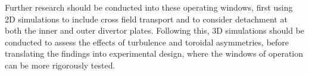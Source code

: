 \documentclass[12pt]{article}  %
\begin{document}
Further research should be conducted into these operating windows, first using 2D simulations to include cross field transport and to consider detachment at both the inner and outer divertor plates. Following this, 3D simulations should be conducted to assess the effects of turbulence and toroidal asymmetries, before translating the findings into experimental design, where the windows of operation can be more rigorously tested.





\printbibliography
\end{document}
